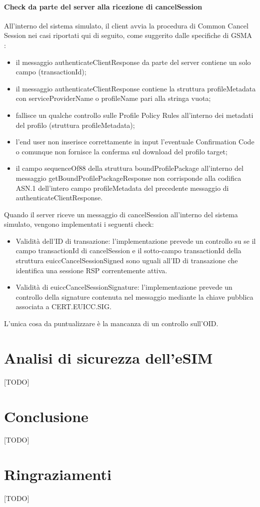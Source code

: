 \documentclass[10pt, oneside]{book}
\begin{document}
\subsubsection{Check da parte del server alla ricezione di cancelSession}
All'interno del sistema simulato, il client avvia la procedura di Common Cancel Session nei casi riportati qui di seguito, come suggerito dalle specifiche di GSMA \cite{GSMA-docs-new}:
\begin{itemize}
\item il messaggio authenticateClientResponse da parte del server contiene un solo campo (transactionId);
\item il messaggio authenticateClientResponse contiene la struttura profileMetadata con serviceProviderName o profileName pari alla stringa vuota;
\item fallisce un qualche controllo sulle Profile Policy Rules all'interno dei metadati del profilo (struttura profileMetadata);
\item l'end user non inserisce correttamente in input l'eventuale Confirmation Code o comunque non fornisce la conferma sul download del profilo target;
\item il campo sequenceOf88 della struttura boundProfilePackage all'interno del messaggio getBoundProfilePackageResponse non corrisponde alla codifica ASN.1 dell'intero campo profileMetadata del precedente messaggio di authenticateClientResponse.
\end{itemize}
Quando il server riceve un messaggio di cancelSession all'interno del sistema simulato, vengono implementati i seguenti check:
\begin{itemize}
\item Validità dell'ID di transazione: l'implementazione prevede un controllo su se il campo transactionId di cancelSession e il sotto-campo transactionId della struttura euiccCancelSessionSigned sono uguali all'ID di transazione che identifica una sessione RSP correntemente attiva.
\item Validità di euiccCancelSessionSignature: l'implementazione prevede un controllo della signature contenuta nel messaggio mediante la chiave pubblica associata a CERT.EUICC.SIG.
\end{itemize}
L'unica cosa da puntualizzare è la mancanza di un controllo sull'OID.

\chapter{Analisi di sicurezza dell'eSIM}
[TODO]

\chapter{Conclusione}
[TODO]



\chapter*{Ringraziamenti}
[TODO]
\end{document}
